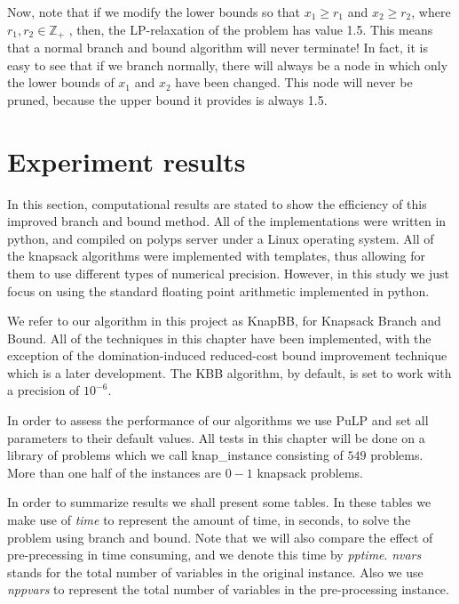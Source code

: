 \documentclass[a4paper,11pt]{article}
\begin{document}
Now, note that if we modify the lower bounds so that $x_1\geq r_1$ and $x_2 \geq r_2$, where $r_1 , r_2 \in \mathbb Z_+$ , then, the LP-relaxation of the problem has value 1.5. This means that a normal branch and bound algorithm will never terminate! In fact, it is easy to see that if we branch normally, there will always be a node in which only the lower bounds of $x_1$ and $x_2$ have been changed. This node will never be pruned, because the upper bound it provides is always 1.5.

\section{Experiment results}
In this section, computational results are stated to show the efficiency of this improved branch and bound method. All of the implementations were written in python, and compiled on polyps server under a Linux operating system. All of the knapsack algorithms were implemented with templates, thus allowing for them to use different types of numerical precision. However, in this study we just focus on using the standard floating point arithmetic implemented in python.

We refer to our algorithm in this project as KnapBB, for Knapsack Branch and Bound. All of the techniques in this chapter have been implemented, with the exception of the domination-induced reduced-cost bound improvement technique which is a later development. The KBB algorithm, by default, is set to work with a precision of $10^{-6}$.

In order to assess the performance of our algorithms we use PuLP and set all parameters to their default values. All tests in this chapter will be done on a library of problems which we call knap\_instance consisting of $549$ problems. More than one half of the instances are $0-1$ knapsack problems. 

In order to summarize results we shall present some tables. In these tables we make use of \textit{time} to represent the amount of time, in seconds, to solve the problem using branch and bound. Note that we will also compare the effect of pre-precessing in time consuming, and we denote this time by \textit{pptime}.  \textit{nvars} stands for the total number of variables in the original instance. Also we use \textit{nppvars} to represent the total number of variables in the pre-processing instance.

\end{document}
